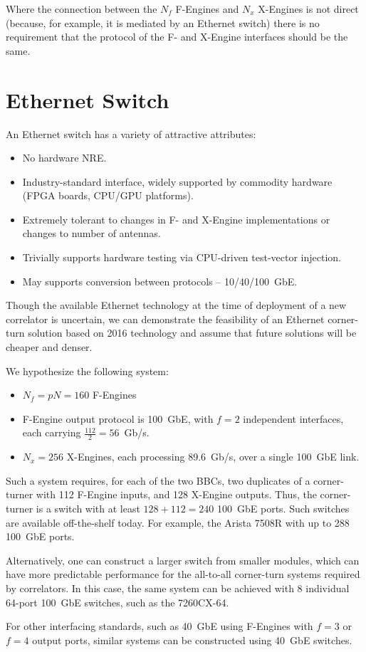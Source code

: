\documentclass{article}
\begin{document}
Where the connection between the $N_f$ F-Engines and $N_x$ X-Engines is not direct (because, for example, it is mediated by an Ethernet switch) there is no requirement that the protocol of the F- and X-Engine interfaces should be the same.

\section{Ethernet Switch}
An Ethernet switch has a variety of attractive attributes:
\begin{itemize}
    \item No hardware NRE.
    \item Industry-standard interface, widely supported by commodity hardware (FPGA boards, CPU/GPU platforms).
    \item Extremely tolerant to changes in F- and X-Engine implementations or changes to number of antennas.
    \item Trivially supports hardware testing via CPU-driven test-vector injection.
    \item May supports conversion between protocols -- 10/40/100~GbE.
\end{itemize}

Though the available Ethernet technology at the time of deployment of a new correlator is uncertain, we can demonstrate the feasibility of an Ethernet corner-turn solution based on 2016 technology and assume that future solutions will be cheaper and denser.

We hypothesize the following system:
\begin{itemize}
    \item $N_f = pN = 160$ F-Engines
    \item F-Engine output protocol is 100~GbE, with $f=2$ independent interfaces, each carrying $\frac{112}{2} = 56$~Gb/s.
    \item $N_x = 256$ X-Engines, each processing 89.6~Gb/s, over a single 100~GbE link.
\end{itemize}

Such a system requires, for each of the two BBCs, two duplicates of a corner-turner with 112 F-Engine inputs, and 128 X-Engine outputs. Thus, the corner-turner is a switch with at least $128+112=240$ 100~GbE ports. Such switches are available off-the-shelf today. For example, the Arista 7508R with up to 288 100~GbE ports.

Alternatively, one can construct a larger switch from smaller modules, which can have more predictable performance for the all-to-all corner-turn systems required by correlators. In this case, the same system can be achieved with 8 individual 64-port 100~GbE switches, such as the 7260CX-64.

For other interfacing standards, such as 40~GbE using F-Engines with $f=3$ or $f=4$ output ports, similar systems can be constructed using 40~GbE switches.

{}

\end{document}
